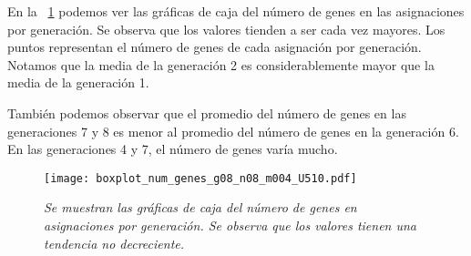 En la \figurename{~\ref{boxplot_num_genes_x_generacion}} podemos ver las gráficas de caja del número de genes en las asignaciones por generación. Se observa que los valores tienden a ser cada vez mayores. Los puntos representan el número de genes de cada asignación por generación. Notamos que la media de la generación 2 es considerablemente mayor que la media de la generación 1.

También podemos observar que el promedio del número de genes en las generaciones 7 y 8 es menor al promedio del número de genes en la generación 6. En las generaciones 4 y 7, el número de genes varía mucho.

\begin{figure}[H]
\centering
\texttt{[image: boxplot\_num\_genes\_g08\_n08\_m004\_U510.pdf]} %
\caption[\textit{Gráficas de caja del número de genes en asignaciones por generación}]{\textit{Se muestran las gráficas de caja del número de genes en asignaciones por generación. Se observa que los valores tienen una tendencia no decreciente.}}\label{boxplot_num_genes_x_generacion}
\end{figure}


%


